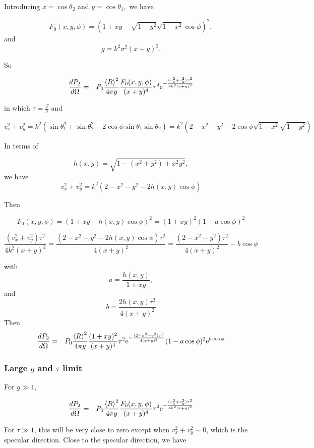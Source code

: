 \documentclass[11pt]{article}
\newcommand{\der}[2]{\frac{d {#1}}{d {#2}}}
\newcommand{\e}{{\rm e}}
\begin{document}
{{{{Introducing $x=\cos\theta_{2}$ and $y=\cos\theta_{1},$ we have

$$F_{0}(x,y,\phi)=\left(1+xy-\sqrt{1-y^{2}}\sqrt{1-x^{2}}\cos\phi\right)^{2},$$
and
$$g=k^{2}\sigma^{2}(x+y)^{2}.$$

So

\begin{eqnarray}
\der{P_{2}}{\Omega}&=&P_{0}\frac{\left<R\right>^{2}}{4\pi y}\frac{F_{0}(x,y,\phi)}{(x+y)^{4}}\tau^{2}\e^{-\frac{(v_{x}^{2}+v_{y}^{2})\tau^{2}}{4k^{2}(x+y)^{2}}}\end{eqnarray}

in which $\tau=\frac{T}{\sigma}$
and

$$v_{x}^{2}+v_{y}^{2}=k^{2}\left(\sin\theta_{1}^{2}+\sin\theta_{2}^{2}-2\cos\phi\sin\theta_{1}\sin\theta_{2}\right)=k^{2}\left(2-x^{2}-y^{2}-2\cos\phi\sqrt{1-x^{2}}\sqrt{1-y^{2}}\right)$$

In terms of 

$$h(x,y)=\sqrt{1-(x^{2}+y^{2})+x^{2}y^{2}},$$
we have
$$v_{x}^{2}+v_{y}^{2}=k^{2}\left(2-x^{2}-y^{2}-2h(x,y)\cos\phi\right)$$

Then

$$F_{0}(x,y,\phi)=\left(1+xy-h(x,y)\cos\phi\right)^{2}=(1+xy)^{2}(1-a\cos\phi)^{2}$$

$$\frac{(v_{x}^{2}+v_{y}^{2})\tau^{2}}{4k^{2}(x+y)^{2}}=\frac{\left(2-x^{2}-y^{2}-2h(x,y)\cos\phi\right)\tau^{2}}{4(x+y)^{2}}=\frac{\left(2-x^{2}-y^{2}\right)\tau^{2}}{4(x+y)^{2}}-b\cos\phi$$

with
$$a=\frac{h(x,y)}{1+xy},$$
and
$$b=\frac{2h(x,y)\tau^{2}}{4(x+y)^{2}}$$
Then
\begin{eqnarray}\der{P_{2}}{\Omega}
&=&P_{0}\frac{\left<R\right>^{2}}{4\pi y}\frac{(1+xy)^{2}}{(x+y)^{4}}\tau^{2}\e^{-\frac{(2-x^{2}-y^{2})\tau^{2}}{4(x+y)^{2}}}(1-a\cos\phi)^{2}\e^{b\cos\phi}\end{eqnarray}

\subsubsection{Large $g$ and $\tau$ limit}
For $g\gg 1$,

\begin{eqnarray}
\der{P_{2}}{\Omega}&=&P_{0}\frac{\left<R\right>^{2}}{4\pi y}\frac{F_{0}(x,y,\phi)}{(x+y)^{4}}\tau^{2}\e^{-\frac{(v_{x}^{2}+v_{y}^{2})\tau^{2}}{4k^{2}(x+y)^{2}}}\end{eqnarray}

For $\tau\gg 1$, this will be very close to zero except when $v_{x}^{2}+v_{y}^{2}\sim0$, which is the specular direction. Close to the specular direction, we have

}}}}
\end{document}
